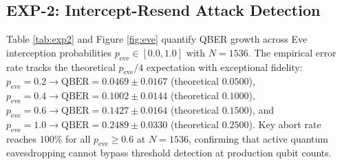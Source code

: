 \documentclass[journal,10pt,twocolumn]{article}
\begin{document}
\subsection{EXP-2: Intercept-Resend Attack Detection}
Table \ref{tab:exp2} and Figure \ref{fig:eve} quantify QBER growth across Eve interception probabilities $p_{\text{eve}} \in [0.0, 1.0]$ with $N=1536$. The empirical error rate tracks the theoretical $p_{\text{eve}}/4$ expectation with exceptional fidelity: $p_{\text{eve}}=0.2 \to \text{QBER} = 0.0469 \pm 0.0167$ (theoretical $0.0500$), $p_{\text{eve}}=0.4 \to \text{QBER} = 0.1002 \pm 0.0144$ (theoretical $0.1000$), $p_{\text{eve}}=0.6 \to \text{QBER} = 0.1427 \pm 0.0164$ (theoretical $0.1500$), and $p_{\text{eve}}=1.0 \to \text{QBER} = 0.2489 \pm 0.0330$ (theoretical $0.2500$). Key abort rate reaches $100\%$ for all $p_{\text{eve}} \ge 0.6$ at $N=1536$, confirming that active quantum eavesdropping cannot bypass threshold detection at production qubit counts.
\end{document}
